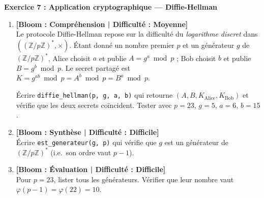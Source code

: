 \documentclass[12pt,a4paper]{report}
\theoremstyle{definition}
\theoremstyle{remark}
\begin{document}
\noindent\textbf{Exercice 7 : Application cryptographique --- Diffie-Hellman}
\begin{enumerate}
    \item \textbf{[Bloom : Compréhension | Difficulté : Moyenne]} \\
    Le protocole Diffie-Hellman repose sur la difficulté du \emph{logarithme discret} dans $((\mathbb{Z}/p\mathbb{Z})^*, \times)$. Étant donné un nombre premier $p$ et un générateur $g$ de $(\mathbb{Z}/p\mathbb{Z})^*$, Alice choisit $a$ et publie $A = g^a \bmod p$ ; Bob choisit $b$ et publie $B = g^b \bmod p$. Le secret partagé est $K = g^{ab} \bmod p = A^b \bmod p = B^a \bmod p$.

    Écrire \texttt{diffie\_hellman(p, g, a, b)} qui retourne $(A, B, K_{\text{Alice}}, K_{\text{Bob}})$ et vérifie que les deux secrets coïncident. Tester avec $p = 23$, $g = 5$, $a = 6$, $b = 15$.
    \item \textbf{[Bloom : Synthèse | Difficulté : Difficile]} \\
    Écrire \texttt{est\_generateur(g, p)} qui vérifie que $g$ est un générateur de $(\mathbb{Z}/p\mathbb{Z})^*$ (i.e.\ son ordre vaut $p - 1$).
    \item \textbf{[Bloom : Évaluation | Difficulté : Difficile]} \\
    Pour $p = 23$, lister tous les générateurs. Vérifier que leur nombre vaut $\varphi(p - 1) = \varphi(22) = 10$.
\end{enumerate}

\vspace{0.3cm}
\end{document}
